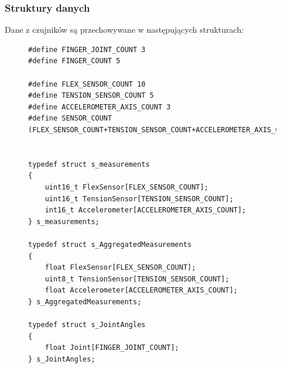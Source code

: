\documentclass[12pt,a4paper]{article}
\begin{document}
\subsubsection{Struktury danych}
Dane z czujników są przechowywane w następujących strukturach:
\begin{figure}[!htb]
\begin{lstlisting}[frame=single]
#define FINGER_JOINT_COUNT 3
#define FINGER_COUNT 5

#define FLEX_SENSOR_COUNT 10
#define TENSION_SENSOR_COUNT 5
#define ACCELEROMETER_AXIS_COUNT 3
#define SENSOR_COUNT (FLEX_SENSOR_COUNT+TENSION_SENSOR_COUNT+ACCELEROMETER_AXIS_COUNT)


typedef struct s_measurements
{
	uint16_t FlexSensor[FLEX_SENSOR_COUNT];
	uint16_t TensionSensor[TENSION_SENSOR_COUNT];
	int16_t Accelerometer[ACCELEROMETER_AXIS_COUNT];
} s_measurements;

typedef struct s_AggregatedMeasurements
{
	float FlexSensor[FLEX_SENSOR_COUNT];
	uint8_t TensionSensor[TENSION_SENSOR_COUNT];
	float Accelerometer[ACCELEROMETER_AXIS_COUNT];
} s_AggregatedMeasurements;

typedef struct s_JointAngles
{
	float Joint[FINGER_JOINT_COUNT];
} s_JointAngles;
\end{lstlisting}
\end{figure}
\end{document}
